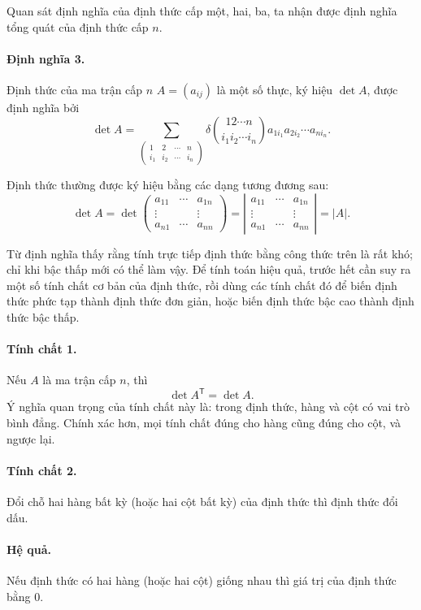 \documentclass[11pt]{article}
\newcommand{\mat}[1]{\begin{pmatrix}#1\end{pmatrix}}
\begin{document}
Quan sát định nghĩa của định thức cấp một, hai, ba, ta nhận được định nghĩa
tổng quát của định thức cấp \(n\).

\paragraph{Định nghĩa 3.}
Định thức của ma trận cấp \(n\) \(A=(a_{ij})\) là một số thực, ký hiệu
\(\det A\), được định nghĩa bởi
\[
  \det A=
  \sum_{\mat{1&2&\cdots&n\\ i_1&i_2&\cdots&i_n}}
  \delta\!\binom{12\cdots n}{i_1i_2\cdots i_n}
  a_{1i_1}a_{2i_2}\cdots a_{ni_n}.
\]

Định thức thường được ký hiệu bằng các dạng tương đương sau:
\[
  \det A
  =
  \det\mat{a_{11}&\cdots&a_{1n}\\
           \vdots&       &\vdots\\
           a_{n1}&\cdots&a_{nn}}
  =
  \left|\begin{matrix}
    a_{11}&\cdots&a_{1n}\\
    \vdots&       &\vdots\\
    a_{n1}&\cdots&a_{nn}
  \end{matrix}\right|
  =|A|.
\]

Từ định nghĩa thấy rằng tính trực tiếp định thức bằng công thức trên là rất
khó; chỉ khi bậc thấp mới có thể làm vậy. Để tính toán hiệu quả, trước hết cần
suy ra một số tính chất cơ bản của định thức, rồi dùng các tính chất đó để
biến định thức phức tạp thành định thức đơn giản, hoặc biến định thức bậc cao
thành định thức bậc thấp.

\paragraph{Tính chất 1.}
Nếu \(A\) là ma trận cấp \(n\), thì
\[
  \det A^{\mathsf T}=\det A.
\]
Ý nghĩa quan trọng của tính chất này là: trong định thức, hàng và cột có vai
trò bình đẳng. Chính xác hơn, mọi tính chất đúng cho hàng cũng đúng cho cột,
và ngược lại.

\paragraph{Tính chất 2.}
Đổi chỗ hai hàng bất kỳ (hoặc hai cột bất kỳ) của định thức thì định thức đổi
dấu.

\paragraph{Hệ quả.}
Nếu định thức có hai hàng (hoặc hai cột) giống nhau thì giá trị của định thức
bằng \(0\).
\end{document}
